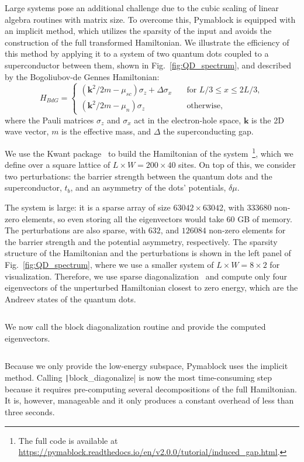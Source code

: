Large systems pose an additional challenge due to the cubic scaling of linear algebra routines with matrix size.
To overcome this, Pymablock is equipped with an implicit method, which utilizes the sparsity of the input and avoids the construction of the full transformed Hamiltonian.
We illustrate the efficiency of this method by applying it to a system of two quantum dots coupled to a superconductor between them, shown in
Fig.~\ref{fig:QD_spectrum}, and described by the Bogoliubov-de Gennes Hamiltonian:
%
\begin{equation}
    H_{BdG} =
    \begin{cases}
        (\mathbf{k}^2/2m - \mu_{sc}) \sigma_z + \Delta \sigma_x \quad & \text{for } L/3 \leq x \leq 2L/3, \\
        (\mathbf{k}^2/2m - \mu_n) \sigma_z \quad & \text{otherwise},
    \end{cases}
\end{equation}
where the Pauli matrices $\sigma_z$ and $\sigma_x$ act in the electron-hole space, $\mathbf{k}$ is the 2D wave vector, $m$ is the effective mass, and $\Delta$ the superconducting gap.

We use the Kwant package~\cite{Groth_2014} to build the Hamiltonian of the system~\footnote{The full code is available at \url{https://pymablock.readthedocs.io/en/v2.0.0/tutorial/induced_gap.html}.}, which we define over a square lattice of $L \times W = 200 \times 40$ sites.
On top of this, we consider two perturbations: the barrier strength between the quantum dots and the superconductor, $t_b$, and an asymmetry of the dots' potentials, $\delta \mu$.

The system is large: it is a sparse array of size $63042 \times 63042$, with $333680$ non-zero elements, so even storing all the eigenvectors would take $60$ GB of memory.
The perturbations are also sparse, with $632$, and $126084$ non-zero elements for the barrier strength and the potential asymmetry, respectively.
The sparsity structure of the Hamiltonian and the perturbations is shown in the left panel of Fig.~\ref{fig:QD_spectrum}, where we use a smaller system of $L \times W = 8 \times 2$ for visualization.
Therefore, we use sparse diagonalization~\cite{Virtanen_2020} and compute only four eigenvectors of the unperturbed Hamiltonian closest to zero energy, which are the Andreev states of the quantum dots.
%
\inputminted[firstline=61, lastline=62]{python}{code_figures/lattice_system.py}
%
We now call the block diagonalization routine and provide the computed eigenvectors.
%
\inputminted[firstline=64, lastline=64]{python}{code_figures/lattice_system.py}
%
Because we only provide the low-energy subspace, Pymablock uses the implicit method.
Calling \texttt|block_diagonalize| is now the most time-consuming step because it requires pre-computing several decompositions of the full Hamiltonian.
It is, however, manageable and it only produces a constant overhead of less than three seconds.


